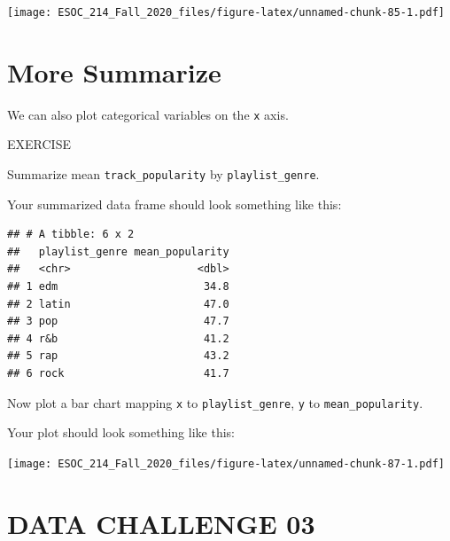 \documentclass[
]{book}
\newenvironment{Shaded}{\begin{snugshade}}{\end{snugshade}}
\newcommand{\DataTypeTok}[1]{\textcolor[rgb]{0.13,0.29,0.53}{#1}}
\newcommand{\KeywordTok}[1]{\textcolor[rgb]{0.13,0.29,0.53}{\textbf{#1}}}
\newcommand{\NormalTok}[1]{#1}
\newcommand{\OperatorTok}[1]{\textcolor[rgb]{0.81,0.36,0.00}{\textbf{#1}}}
\newcommand{\StringTok}[1]{\textcolor[rgb]{0.31,0.60,0.02}{#1}}
\begin{document}
\begin{Shaded}
\end{Shaded}

\texttt{[image: ESOC\_214\_Fall\_2020\_files/figure-latex/unnamed-chunk-85-1.pdf]}

\hypertarget{more-summarize}{%
\section{More Summarize}\label{more-summarize}}

We can also plot categorical variables on the \texttt{x} axis.

EXERCISE

Summarize mean \texttt{track\_popularity} by \texttt{playlist\_genre}.

Your summarized data frame should look something like this:

\begin{verbatim}
## # A tibble: 6 x 2
##   playlist_genre mean_popularity
##   <chr>                    <dbl>
## 1 edm                       34.8
## 2 latin                     47.0
## 3 pop                       47.7
## 4 r&b                       41.2
## 5 rap                       43.2
## 6 rock                      41.7
\end{verbatim}

Now plot a bar chart mapping \texttt{x} to \texttt{playlist\_genre}, \texttt{y} to \texttt{mean\_popularity}.

Your plot should look something like this:

\texttt{[image: ESOC\_214\_Fall\_2020\_files/figure-latex/unnamed-chunk-87-1.pdf]}

\hypertarget{data-challenge-03}{%
\section{DATA CHALLENGE 03}\label{data-challenge-03}}
\end{document}
